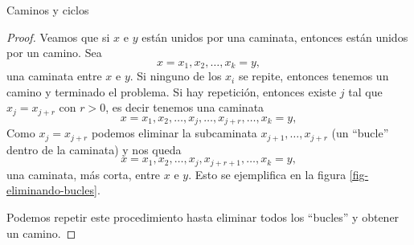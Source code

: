 \begin{section}{Caminos y ciclos}
\begin{proof}
Veamos que si  $x$ e $y$ están unidos por una caminata, entonces están unidos por un camino. Sea 
$$
x=x_1,x_2,\ldots,x_k=y,
$$
una caminata entre  $x$ e $y$. Si ninguno de los $x_i$ se repite, entonces tenemos un camino y terminado el problema. Si hay repetición, entonces existe $j$ tal que $x_j = x_{j+r}$ con $r >0$, es decir tenemos una caminata
$$
x=x_1,x_2,\ldots,x_j,\ldots,x_{j+r},\ldots, x_k=y,
$$
Como $x_j = x_{j+r}$ podemos eliminar la subcaminata $x_{j+1},\ldots,x_{j+r}$ (un ``bucle'' dentro de la caminata) y nos queda 
$$
x=x_1,x_2,\ldots,x_j,x_{j+r+1},\ldots, x_k=y,
$$
una caminata, más corta,  entre $x$ e $y$. Esto se ejemplifica en la figura \ref{fig-eliminando-bucles}.


Podemos repetir este procedimiento hasta eliminar todos los ``bucles'' y obtener un camino.
\end{proof}

\begin{figure}[ht]
    \begin{center}
\end{center}
\end{figure}
\end{section}

